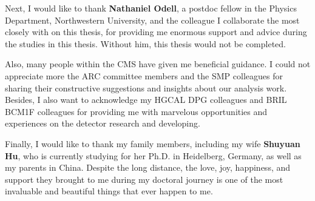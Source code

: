 \documentclass[12pt,reqno]{nuthesis}
\begin{document}
    Next, I would like to thank \textbf{Nathaniel Odell}, a postdoc fellow in the Physics Department, Northwestern University, and the colleague I collaborate the most closely with on this thesis, for providing me enormous support and advice during the studies in this thesis. Without him, this thesis would not be completed. 

    Also, many people within the CMS have given me beneficial guidance. I could not appreciate more the ARC committee members and the SMP colleagues for sharing their constructive suggestions and insights about our analysis work. Besides, I also want to acknowledge my HGCAL DPG colleagues and BRIL BCM1F colleagues for providing me with marvelous opportunities and experiences on the detector research and developing.

    Finally, I would like to thank my family members, including my wife \textbf{Shuyuan Hu}, who is currently studying for her Ph.D. in Heidelberg, Germany, as well as my parents in China. Despite the long distance, the love, joy, happiness, and support they brought to me during my doctoral journey is one of the most invaluable and beautiful things that ever happen to me.



    \clearpage{} 
    \setcounter{tocdepth}{2}
    \begin{spacing}{1.2}
        \tableofcontents	
    \end{spacing}

    \clearpage{} 
    \listoftables


    \clearpage{} 
    \listoffigures



    \mainmatter  
    
    
    
    
    
    


    \begin{singlespace}
    
    
    \end{singlespace}
    

    
\end{document}
